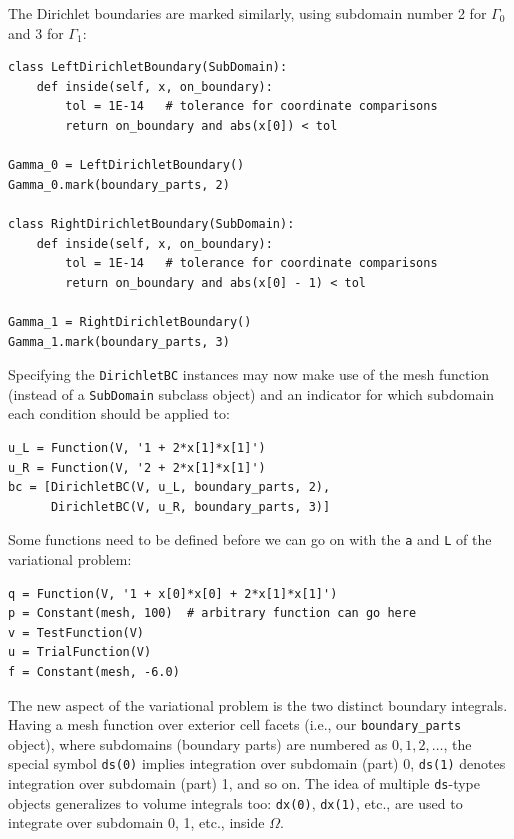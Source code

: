 The Dirichlet boundaries are marked similarly, using subdomain number 2 for $\Gamma_0$ and 3 for $\Gamma_1$:
\begin{Verbatim}[fontsize=\fontsize{10pt}{10pt},tabsize=8,baselinestretch=1.05,
fontfamily=tt,xleftmargin=7mm]
class LeftDirichletBoundary(SubDomain):
    def inside(self, x, on_boundary):
        tol = 1E-14   # tolerance for coordinate comparisons
        return on_boundary and abs(x[0]) < tol

Gamma_0 = LeftDirichletBoundary()
Gamma_0.mark(boundary_parts, 2)

class RightDirichletBoundary(SubDomain):
    def inside(self, x, on_boundary):
        tol = 1E-14   # tolerance for coordinate comparisons
        return on_boundary and abs(x[0] - 1) < tol

Gamma_1 = RightDirichletBoundary()
Gamma_1.mark(boundary_parts, 3)
\end{Verbatim}
\noindent
Specifying the {\fontsize{12pt}{12pt}\texttt{DirichletBC}} instances may now make use of
the mesh function (instead of a {\fontsize{12pt}{12pt}\texttt{SubDomain}} subclass object)
and an indicator for which subdomain each condition
should be applied to:
\begin{Verbatim}[fontsize=\fontsize{10pt}{10pt},tabsize=8,baselinestretch=1.05,
fontfamily=tt,xleftmargin=7mm]
u_L = Function(V, '1 + 2*x[1]*x[1]')
u_R = Function(V, '2 + 2*x[1]*x[1]')
bc = [DirichletBC(V, u_L, boundary_parts, 2),
      DirichletBC(V, u_R, boundary_parts, 3)]
\end{Verbatim}
\noindent

Some functions need to be defined before we can go on with the
{\fontsize{12pt}{12pt}\texttt{a}} and {\fontsize{12pt}{12pt}\texttt{L}} of the variational problem:
\begin{Verbatim}[fontsize=\fontsize{10pt}{10pt},tabsize=8,baselinestretch=1.05,
fontfamily=tt,xleftmargin=7mm]
q = Function(V, '1 + x[0]*x[0] + 2*x[1]*x[1]')
p = Constant(mesh, 100)  # arbitrary function can go here
v = TestFunction(V)
u = TrialFunction(V)
f = Constant(mesh, -6.0)
\end{Verbatim}
\noindent

The new aspect of the variational problem is the two distinct
boundary integrals.
Having a mesh function over exterior cell facets (i.e., our
{\fontsize{12pt}{12pt}\verb!boundary_parts!} object), where subdomains (boundary parts) are
numbered as $0,1,2,\ldots$, the special symbol {\fontsize{12pt}{12pt}\texttt{ds(0)}}
implies integration over subdomain (part) 0, {\fontsize{12pt}{12pt}\texttt{ds(1)}} denotes
integration over subdomain (part) 1, and so on.
The idea of multiple {\fontsize{12pt}{12pt}\texttt{ds}}-type objects generalizes to volume
integrals too: {\fontsize{12pt}{12pt}\texttt{dx(0)}}, {\fontsize{12pt}{12pt}\texttt{dx(1)}}, etc., are used to
integrate over subdomain 0, 1, etc.,  inside $\Omega$.

